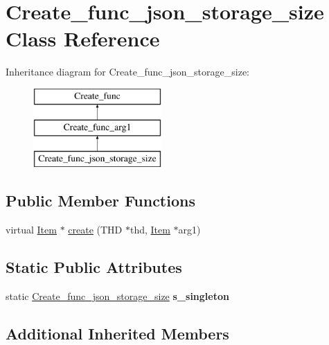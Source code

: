 \hypertarget{classCreate__func__json__storage__size}{}\section{Create\+\_\+func\+\_\+json\+\_\+storage\+\_\+size Class Reference}
\label{classCreate__func__json__storage__size}
Inheritance diagram for Create\+\_\+func\+\_\+json\+\_\+storage\+\_\+size\+:\begin{figure}[H]
\begin{center}
\leavevmode
\includegraphics[height=3.000000cm]{classCreate__func__json__storage__size}
\end{center}
\end{figure}
\subsection*{Public Member Functions}
\begin{DoxyCompactItemize}
\item 
virtual \mbox{\hyperlink{classItem}{Item}} $\ast$ \mbox{\hyperlink{classCreate__func__json__storage__size_a1a72961385b5345997412b59e9550546}{create}} (T\+HD $\ast$thd, \mbox{\hyperlink{classItem}{Item}} $\ast$arg1)
\end{DoxyCompactItemize}
\subsection*{Static Public Attributes}
\begin{DoxyCompactItemize}
\item 
\mbox{\label{classCreate__func__json__storage__size_af894cab0fec88321ca07e14c8a5af855}} 
static \mbox{\hyperlink{classCreate__func__json__storage__size}{Create\+\_\+func\+\_\+json\+\_\+storage\+\_\+size}} {\bfseries s\+\_\+singleton}
\end{DoxyCompactItemize}
\subsection*{Additional Inherited Members}


